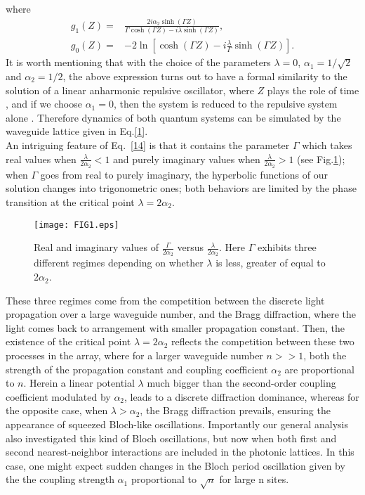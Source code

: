 \documentclass[12pt]{article}
\numberwithin{equation}{section}
\begin{document}
where
\begin{subequations} \label{15}
\begin{align} 
g_{1}(Z)=&\frac{2i \alpha_{2}\sinh\left(\Gamma Z\right)}{\Gamma \cosh\left(\Gamma Z\right) - i \lambda  \sinh\left(\Gamma Z\right)},    \\
g_{0}(Z)=&-2 \ln \left[\cosh(\Gamma Z)-i \frac{ \lambda}{\Gamma} \sinh(\Gamma Z)\right].
\end{align}
\end{subequations}
It is worth mentioning that with the choice of the parameters $\lambda=0$, $\alpha_{1}=1/\sqrt{2}$ and $\alpha_{2}=1/2$, the above expression turns out to have a formal similarity to the solution of a linear anharmonic repulsive oscillator, where $Z$ plays the role of time \cite{28}, and if we choose $\alpha_{1}=0$, then the system is reduced to the repulsive system alone \cite{28}. Therefore dynamics of both quantum systems can be simulated by the waveguide lattice given in Eq.\eqref{1}.\\ 
An intriguing feature of Eq.~\eqref{14} is that it contains the parameter $\Gamma$ which takes real values when $ \frac{\lambda}{2\alpha_{2}} < 1$ and purely imaginary values when $ \frac{\lambda}{2\alpha_{2}}>1$ (see Fig.\ref{f1}); when $\Gamma$ goes from real to purely imaginary, the hyperbolic functions of our solution changes into trigonometric ones; both behaviors are limited by the phase transition at the critical point $\lambda=2\alpha_{2}$.
\begin{figure}[H]
	\centering
	{\texttt{[image: FIG1.eps]}}
	\caption{Real and imaginary values of $\frac{\Gamma}{2\alpha_{2}}$ versus $\frac{\lambda}{2\alpha_{2}}$. Here $\Gamma$ exhibits three different regimes depending on whether $\lambda$ is less, greater of equal to $2\alpha_{2}$.}
	\label{f1}
\end{figure}
These three regimes come from the competition between the discrete light propagation over a large waveguide number, and the Bragg diffraction, where the light comes back to arrangement with smaller propagation constant. Then, the existence of the critical point $\lambda=2\alpha_{2}$ reflects the competition between these two processes in the array, where for a larger waveguide number $n>>1$, both the strength of the propagation constant and coupling coefficient $\alpha_2$ are proportional to $n$. Herein a linear potential $\lambda$ much bigger than the second-order coupling coefficient modulated by $\alpha_{2}$, leads to a discrete diffraction dominance, whereas for the opposite case, when $\lambda>\alpha_{2}$, the Bragg diffraction prevails, ensuring the appearance of squeezed Bloch-like oscillations\cite{13A,14A}. Importantly our general analysis also investigated this kind of Bloch oscillations, but now when both first and second nearest-neighbor interactions are included in the photonic lattices\cite{13A}. In this case, one might expect sudden changes in the Bloch period oscillation given by the the coupling strength $\alpha_{1}$ proportional to $\sqrt{n}$ for large n sites.
\end{document}
